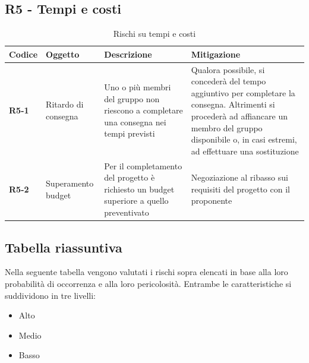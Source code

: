 \documentclass[a4paper,12pt]{article}
\begin{document}
    \subsection{R5 - Tempi e costi}
        \begin{table}[H]
        \label{tab:r5}
            \begin{tabularx}{\textwidth}{|l|L|L|L|}
            \hline
            \textbf{Codice} & \textbf{Oggetto} & \textbf{Descrizione} & \textbf{Mitigazione}\\
            \hline
            \textbf{R5-1} & Ritardo di consegna & Uno o più membri del gruppo non riescono a completare una consegna nei tempi previsti & Qualora possibile, si concederà del tempo aggiuntivo per completare la consegna. Altrimenti si procederà ad affiancare un membro del gruppo disponibile o, in casi estremi, ad effettuare una sostituzione\\
            \hline
            \textbf{R5-2} & Superamento budget & Per il completamento del progetto è richiesto un budget superiore a quello preventivato & Negoziazione al ribasso sui requisiti del progetto con il proponente \\
            \hline
            \end{tabularx}
            \caption{Rischi su tempi e costi}
        \end{table}

    \subsection{Tabella riassuntiva}
        Nella seguente tabella vengono valutati i rischi sopra elencati in base alla loro probabilità di occorrenza e alla loro pericolosità. Entrambe le caratteristiche si suddividono in tre livelli:
        \begin{itemize}
            \item Alto
            \item Medio
            \item Basso
        \end{itemize}
\end{document}
